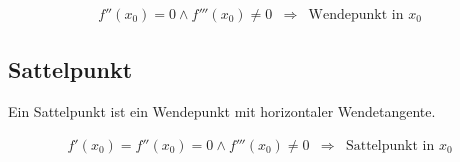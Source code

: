\[ \boxed{ \begin{matrix}
f''(x_0) = 0 \land f'''(x_0) \neq 0 & \Rightarrow & \text{Wendepunkt in $x_0$}
\end{matrix} } \]

\subsection{Sattelpunkt}
Ein Sattelpunkt ist ein Wendepunkt mit horizontaler Wendetangente.

\[ \boxed{ \begin{matrix}
f'(x_0) =  f''(x_0) = 0 \land f'''(x_0) \neq 0 & \Rightarrow & \text{Sattelpunkt in $x_0$}
\end{matrix} } \]